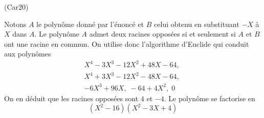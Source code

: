 \begin{tiny}(Car20)\end{tiny} Notons $A$ le polynôme donné par l'énoncé et $B$ celui obtenu en substituant $-X$ à $X$ dans $A$.\newline
Le polynôme $A$ admet deux racines opposées si et seulement si $A$ et $B$ ont une racine en commun. On utilise donc l'algorithme d'Euclide qui conduit aux polynômes
\begin{multline*}
 X^4-3X^3-12X^2+48X-64,\\
X^4+3X^3-12X^2-48X-64,\;\\
-6X^3+96X,\; -64+4X^2,\;0
\end{multline*}
On en déduit que les racines opposées sont $4$ et $-4$. Le polynôme se factorise en
\begin{displaymath}
 (X^2-16)(X^2-3X+4)
\end{displaymath}
